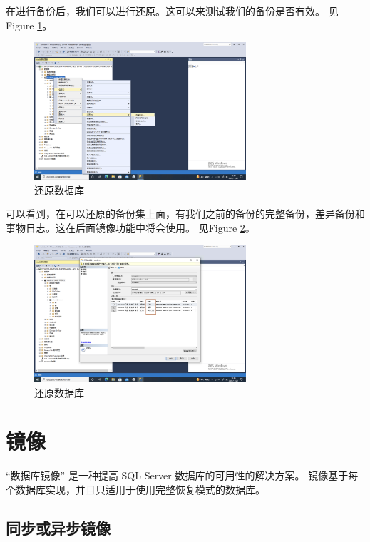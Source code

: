 \documentclass[onecolumn,oneside]{BUPTHomework}
\begin{document}
  在进行备份后，我们可以进行还原。这可以来测试我们的备份是否有效。
  见Figure \ref{pic6}。

  \newpage

  \begin{figure}[h]
    \centering
    \includegraphics[width=0.70\textwidth]{image/pic6.png}
    \caption{还原数据库}
    \label{pic6}
  \end{figure}

  可以看到，在可以还原的备份集上面，有我们之前的备份的完整备份，差异备份和事物日志。这在后面镜像功能中将会使用。
  见Figure \ref{pic7}。

  \begin{figure}[h]
    \centering
    \includegraphics[width=0.70\textwidth]{image/pic7.png}
    \caption{还原数据库}
    \label{pic7}
  \end{figure}

  \section{镜像}

  “数据库镜像” 是一种提高 SQL Server 数据库的可用性的解决方案。
  镜像基于每个数据库实现，并且只适用于使用完整恢复模式的数据库。

  \subsection{同步或异步镜像}
\end{document}
